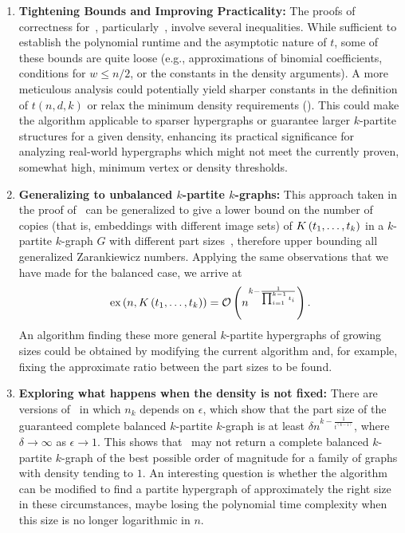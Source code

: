 \begin{enumerate}
    \item \textbf{Tightening Bounds and Improving Practicality:}
    The proofs of correctness for~, particularly~,
    involve several inequalities.
    While sufficient to establish the polynomial runtime and the asymptotic nature of $t$,
    some of these bounds are quite loose (e.g., approximations of binomial coefficients, conditions for $w \leq n/2$,
    or the constants in the density arguments).
    A more meticulous analysis could potentially yield sharper constants in the definition of
    $t(n,d,k)$ or relax the minimum density requirements ().
    This could make the algorithm applicable to sparser hypergraphs or guarantee larger $k$-partite structures for a given density,
    enhancing its practical significance for analyzing real-world hypergraphs which might not meet the currently proven,
    somewhat high, minimum vertex or density thresholds.

    \item \textbf{Generalizing to unbalanced $k$-partite $k$-graphs:}
    This approach taken in the proof of~
    can be generalized to give a lower bound on the number of
    copies (that is, embeddings with different image sets)
    of $K\left(t_1, \dots, t_k\right)$ in a $k$-partite $k$-graph $G$
    with different part sizes~\cite{carvajal2024canonical},
    therefore upper bounding all generalized Zarankiewicz numbers.
    Applying the same observations that we have made for the balanced case,
    we arrive at
    \begin{equation} \label{eq:general-partite-bound}
        \text{ex} \left( n, K\left(t_1, \dots, t_k\right) \right) = \mathcal{O}\left(n^{k - \frac{1}{\prod_{i=1}^{k-1} t_i}}\right).
    \end{equation}
    An algorithm finding these more general $k$-partite hypergraphs
    of growing sizes could be obtained by modifying the current algorithm
    and, for example, fixing the approximate ratio between the part sizes to be found.

    \item \textbf{Exploring what happens when the density is not fixed:}
    There are versions of~
    in which $n_k$ depends on $\epsilon$, which show that the part size of the
    guaranteed complete balanced $k$-partite $k$-graph is at least $\delta n^{k-\frac{1}{t^{(k-1)}}}$,
    where $\delta \to \infty$ as $\epsilon \to 1$.
    This shows that~ may not return a complete balanced $k$-partite
    $k$-graph of the best possible order of magnitude for a family of graphs with density tending to $1$.
    An interesting question is whether the algorithm can be modified to find
    a partite hypergraph of approximately the right size in these circumstances,
    maybe losing the polynomial time complexity when this size is no longer logarithmic in $n$.


\end{enumerate}
